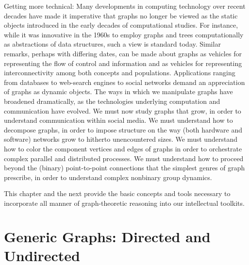 Getting more technical:  Many developments in computing technology over recent decades have made it imperative that graphs no longer be viewed as the static objects introduced in the early decades of computational studies.  For instance, while it was innovative in the 1960s to employ graphs and trees computationally as abstractions of data structures, such a view is standard today.  Similar remarks, perhaps with differing dates, can be made about graphs as vehicles for representing the flow of control and information and as vehicles for representing interconnectivity among both concepts and populations.  Applications ranging from databases to web-search engines to social networks demand an appreciation of graphs as dynamic objects.  The ways in which we manipulate graphs have broadened dramatically, as the technologies underlying computation and communication have evolved.  We must now study graphs that grow, in order to understand communication within social media.  We must understand how to decompose graphs, in order to impose structure on the way (both hardware and software) networks grow to hitherto unencountered sizes.  We must understand how to color the component vertices and edges of graphs in order to orchestrate complex parallel and distributed processes.  We must understand how to proceed beyond the (binary) point-to-point connections that the simplest genres of graph prescribe, in order to understand complex nonbinary group dynamics.

\smallskip

This chapter and the next provide the basic concepts and tools necessary to incorporate all manner of graph-theoretic reasoning into our intellectual toolkits.


\section{Generic Graphs: Directed and Undirected}
\label{sec:graphs-generic}
\label{sec:basic-graphs}


  
   
 
 

